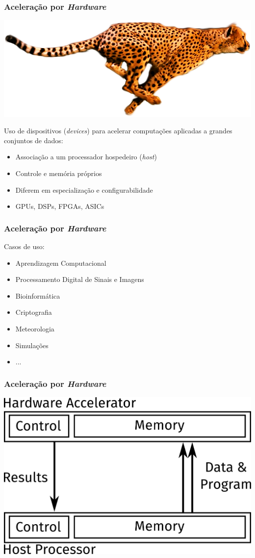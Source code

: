 \documentclass[10pt, compress]{beamer}
\begin{document}
\begin{frame}
    \frametitle{Aceleração por \textit{Hardware}}
    \begin{center}
        \includegraphics[width=.6\textwidth]{accelerate}
    \end{center}

    Uso de \alert{dispositivos} (\textit{devices}) para acelerar computações
    aplicadas a grandes conjuntos de dados:
    \pause
    \begin{itemize}
        \item Associação a um processador \alert{hospedeiro} (\textit{host})
            \pause
        \item \alert{Controle} e \alert{memória} próprios
            \pause
        \item Diferem em \alert{especialização} e \alert{configurabilidade}
            \pause
        \item \alert{GPUs}, DSPs, FPGAs, ASICs
    \end{itemize}
\end{frame}

\begin{frame}
    \frametitle{Aceleração por \textit{Hardware}}
    Casos de uso:
    \begin{itemize}
        \item Aprendizagem Computacional
        \item Processamento Digital de Sinais e Imagens
        \item Bioinformática
        \item Criptografia
        \item Meteorologia
        \item Simulações
        \item ...
    \end{itemize}
\end{frame}

\begin{frame}
    \frametitle{Aceleração por \textit{Hardware}}
    \centering
    \includegraphics[width=.8\textwidth]{accel}
\end{frame}
\end{document}
